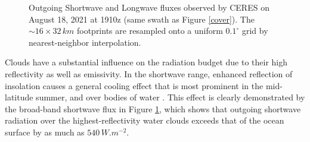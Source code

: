 \documentclass[12pt]{article}
\begin{document}
    \begin{figure}[h!]\label{flux-interp}
        \centering
        \begin{center}
        \end{center}
        \caption{Outgoing Shortwave and Longwave fluxes observed by CERES on August 18, 2021 at 1910z (same swath as Figure \ref{cover}). The $\sim16\times32\,\si{km}$ footprints are resampled onto a uniform $0.1^\circ$ grid by nearest-neighbor interpolation.}
    \end{figure}


     Clouds have a substantial influence on the radiation budget due to their high reflectivity as well as emissivity. In the shortwave range, enhanced reflection of insolation causes a general cooling effect that is most prominent in the mid-latitude summer, and over bodies of water \cite{harrison_seasonal_1990}. This effect is clearly demonstrated by the broad-band shortwave flux in Figure \ref{flux-interp}, which shows that outgoing shortwave radiation over the highest-reflectivity water clouds exceeds that of the ocean surface by as much as $540\,\si{W.m^{-2}}$.
\end{document}
